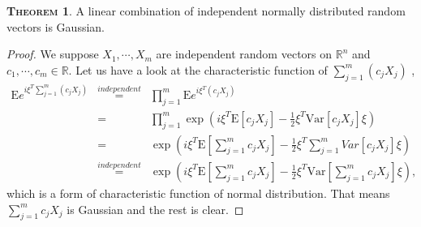 \documentclass[a4paper, twoside, 11pt]{article}
\theoremstyle{definition}
\newtheorem{theorem}[definition]{\scshape Theorem}
\newtheorem{corollary}[definition]{\scshape Corollary}
\newcommand{\brkt}[1]{\left({#1} \right)}
\begin{document}

	


  \begin{theorem}
	A linear combination of independent normally distributed random \\vectors is Gaussian.
  \end{theorem}

  \begin{proof}
	We suppose $X_1, \cdots, X_m$ are independent random vectors on $\mathbb{R}^n$ and $c_1, \cdots, c_m \in \mathbb{R}$. Let us have a look at the characteristic function of $\sum_{j=1}^m(c_jX_j)$ ,
	\begin{eqnarray*}
	  \mathrm{E}e^{i\xi^T\sum_{j=1}^m(c_jX_j)} &\overset{independent}{=}&\prod_{j=1}^{m} \mathrm{E}e^{i\xi^T(c_jX_j)}\\
	  &=& \prod_{j=1}^m \exp\brkt{i\xi^T\mathrm{E}[c_jX_j]-\frac{1}{2}\xi^T\mathrm{Var}[c_jX_j]\xi}\\
	  &=&  \exp\brkt{i\xi^T\mathrm{E}[\sum_{j=1}^{m}c_jX_j]-\frac{1}{2}\xi^T\mathrm\sum_{j=1}^{m}{Var}[c_jX_j]\xi}\\
	  &\overset{independent}{=}&  \exp\brkt{i\xi^T\mathrm{E}[\sum_{j=1}^{m}c_jX_j]-\frac{1}{2}\xi^T\mathrm{Var}[\sum_{j=1}^{m}c_jX_j]\xi},
	\end{eqnarray*}
	which is a form of characteristic function of normal distribution. That means $\sum_{j=1}^m c_jX_j$ is Gaussian and the rest is clear. 
  \end{proof}
\end{document}
